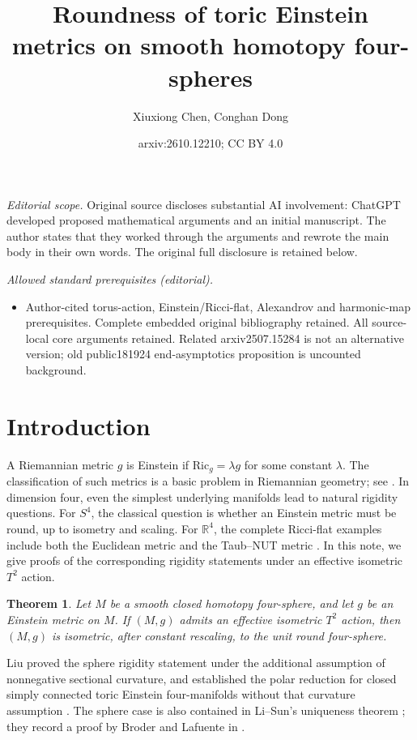 \documentclass[letterpaper]{amsart}
\title{Roundness of toric Einstein metrics on smooth homotopy four-spheres}
\author{Xiuxiong Chen, Conghan Dong}
\date{arxiv:2610.12210; CC BY 4.0}
\newtheorem{thm}{Theorem}[section]
\theoremstyle{definition}
\theoremstyle{remark}
\begin{document}
\maketitle
\noindent\textit{Editorial scope.} Original source discloses substantial AI involvement: ChatGPT developed proposed mathematical arguments and an initial manuscript. The author states that they worked through the arguments and rewrote the main body in their own words. The original full disclosure is retained below.\par\medskip
\noindent\textit{Allowed standard prerequisites (editorial).}\begin{itemize}
\item Author-cited torus-action, Einstein/Ricci-flat, Alexandrov and harmonic-map prerequisites. Complete embedded original bibliography retained. All source-local core arguments retained. Related arxiv2507.15284 is not an alternative version; old public181924 end-asymptotics proposition is uncounted background.
\end{itemize}\medskip
\section{Introduction}
A Riemannian metric $g$ is Einstein if $\mathrm{Ric}_g=\lambda g$ for
some constant $\lambda$. The classification of such metrics is a basic
problem in Riemannian geometry; see \cite{notes-Besse}. In dimension four,
even the simplest underlying manifolds lead to natural rigidity
questions. For $S^4$, the classical question is whether an Einstein
metric must be round, up to isometry and scaling. For $\mathbb R^4$,
the complete Ricci-flat examples include both the Euclidean metric and
the Taub--NUT metric \cite{notes-Hawking,notes-GibbonsHawking}.
In this note, we give proofs of the corresponding rigidity statements
under an effective isometric $T^2$ action.


\begin{thm}\label{thm-sphere}
Let $M$ be a smooth closed homotopy four-sphere, and let $g$ be an Einstein metric
on $M$. If $(M,g)$ admits an effective isometric $T^2$ action, then $(M,g)$
is isometric, after constant rescaling, to the unit round four-sphere.
\end{thm}


Liu proved the sphere rigidity statement under the additional assumption
of nonnegative sectional curvature, and established the polar reduction
for closed simply connected toric Einstein four-manifolds without that
curvature assumption \cite[Theorems~1.1--1.2]{notes-Liu}.
The sphere case is also contained in Li--Sun's uniqueness theorem
\cite[Theorem~1.5]{notes-LiSunCompact}; they record a proof by Broder and
Lafuente in \cite[Remark~D.19]{notes-LiSunCompact}.
\end{document}
